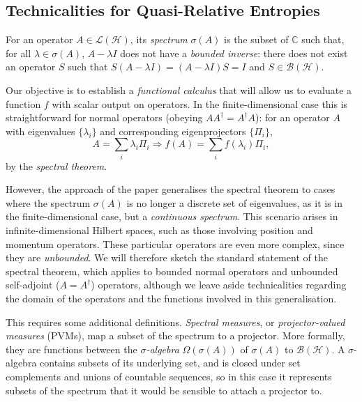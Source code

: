 \documentclass[10pt, a4paper]{article}
\numberwithin{equation}{section} %
\theoremstyle{definition}
\theoremstyle{plain}
\newcommand{\?}{\mathrel{?}} %
\newcommand{\C}{\mathbb{C}} %
\newcommand{\Hs}{\mathcal{H}} %
\begin{document}
    \begin{appendices}
      \section{Technicalities for Quasi-Relative Entropies}\label{sec:qretech}

      For an operator \(A \in \mathcal{L}(\Hs)\), its \emph{spectrum} \(\sigma(A)\) is the subset of \(\C\) such that, for all \(\lambda \in \sigma(A)\), \(A - \lambda I\) does not have a \emph{bounded inverse}: there does not exist an operator \(S\) such that \(S\left( A - \lambda I \right) = \left( A - \lambda I \right)S =  I\) and \(S \in \mathcal{B}(\Hs)\).

      Our objective is to establish a \emph{functional calculus} that will allow us to evaluate a function  \(f\) with scalar output on operators. In the finite-dimensional case this is straightforward for normal operators (obeying \(AA^{\dagger} = A^{\dagger}A\)): for an operator \(A\) with eigenvalues \(\{\lambda_i\}\) and corresponding eigenprojectors \(\{\Pi_i\}\),
      \[ A = \sum_i \lambda_i \Pi_i \Rightarrow f(A) = \sum_i f(\lambda_i) \Pi_i, \]
      by the \emph{spectral theorem}.

      However, the approach of the paper generalises the spectral theorem to cases where the spectrum \(\sigma(A)\) is no longer a discrete set of eigenvalues, as it is in the finite-dimensional case, but a \emph{continuous spectrum}. This scenario arises in infinite-dimensional Hilbert spaces, such as those involving position and momentum operators. These particular operators are even more complex, since they are \emph{unbounded}. We will therefore sketch the standard statement of the spectral theorem, which applies to bounded normal operators and unbounded self-adjoint (\(A = A^{\dagger}\)) operators, although we leave aside technicalities regarding the domain of the operators and the functions involved in this generalisation.

      This requires some additional definitions. \emph{Spectral measures}, or \emph{projector-valued measures} (PVMs), map a subset of the spectrum to a projector. More formally, they are functions between the \emph{\(\sigma\)-algebra} \(\Omega(\sigma(A))\) of \(\sigma(A)\) to \(\mathcal{B}(\Hs)\). A \(\sigma\)-algebra contains subsets of its underlying set, and is closed under set complements and unions of countable sequences, so in this case it represents subsets of the spectrum that it would be sensible to attach a projector to.


\end{appendices}
\end{document}
